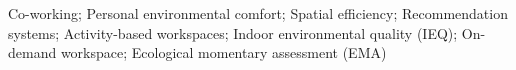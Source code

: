 \documentclass[]{interact}
\theoremstyle{plain}%
\theoremstyle{definition}
\theoremstyle{remark}
\begin{document}
\begin{abstract}


  



\end{abstract}

\begin{keywords}
Co-working; Personal environmental comfort; Spatial efficiency; Recommendation systems; Activity-based workspaces; Indoor environmental quality (IEQ); On-demand workspace; Ecological momentary assessment (EMA)
\end{keywords}
\end{document}
